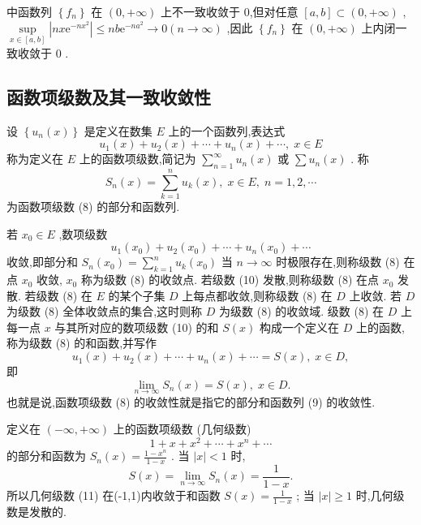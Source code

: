 \begin{example}

\end{example}
中函数列 \(\left\{  {f}_{n}\right\}\) 在 \(\left( {0, + \infty }\right)\) 上不一致收敛于 0,但对任意 \(\left\lbrack  {a,b}\right\rbrack   \subset  \left( {0, + \infty }\right)\) , \(\mathop{\sup }\limits_{{x \in  \left\lbrack  {a,b}\right\rbrack  }}\left| {{nx}{\mathrm{e}}^{-n{x}^{2}}}\right|  \leq  {nb}{\mathrm{e}}^{-n{a}^{2}} \rightarrow  0\left( {n \rightarrow  \infty }\right)\) ,因此 \(\left\{  {f}_{n}\right\}\) 在 \(\left( {0, + \infty }\right)\) 上内闭一致收敛于 0 .

\subsection{函数项级数及其一致收敛性}

设 \(\left\{  {{u}_{n}\left( x\right) }\right\}\) 是定义在数集 \(E\) 上的一个函数列,表达式
\[
{u}_{1}\left( x\right)  + {u}_{2}\left( x\right)  + \cdots  + {u}_{n}\left( x\right)  + \cdots ,\;x \in  E \tag{8}
\]
称为定义在 \(E\) 上的函数项级数,简记为 \(\mathop{\sum }\limits_{{n = 1}}^{\infty }{u}_{n}\left( x\right)\) 或 \(\sum {u}_{n}\left( x\right)\) . 称
\[
{S}_{n}\left( x\right)  = \mathop{\sum }\limits_{{k = 1}}^{n}{u}_{k}\left( x\right) ,\;x \in  E,\;n = 1,2,\cdots  \tag{9}
\]
为函数项级数 (8) 的部分和函数列.

若 \({x}_{0} \in  E\) ,数项级数
\[
{u}_{1}\left( {x}_{0}\right)  + {u}_{2}\left( {x}_{0}\right)  + \cdots  + {u}_{n}\left( {x}_{0}\right)  + \cdots  \tag{10}
\]
收敛,即部分和 \({S}_{n}\left( {x}_{0}\right)  = \mathop{\sum }\limits_{{k = 1}}^{n}{u}_{k}\left( {x}_{0}\right)\) 当 \(n \rightarrow  \infty\) 时极限存在,则称级数 (8) 在点 \({x}_{0}\) 收敛, \({x}_{0}\) 称为级数 (8) 的收敛点. 若级数 (10) 发散,则称级数 (8) 在点 \({x}_{0}\) 发散. 若级数 (8) 在 \(E\) 的某个子集 \(D\) 上每点都收敛,则称级数 (8) 在 \(D\) 上收敛. 若 \(D\) 为级数 (8) 全体收敛点的集合,这时则称 \(D\) 为级数 (8) 的收敛域. 级数 (8) 在 \(D\) 上每一点 \(x\) 与其所对应的数项级数 (10) 的和 \(S\left( x\right)\) 构成一个定义在 \(D\) 上的函数,称为级数 (8) 的和函数,并写作
\[
{u}_{1}\left( x\right)  + {u}_{2}\left( x\right)  + \cdots  + {u}_{n}\left( x\right)  + \cdots  = S\left( x\right) ,\;x \in  D,
\]
即
\[
\mathop{\lim }\limits_{{n \rightarrow  \infty }}{S}_{n}\left( x\right)  = S\left( x\right) ,\;x \in  D.
\]
也就是说,函数项级数 (8) 的收敛性就是指它的部分和函数列 (9) 的收敛性.

\begin{example}

\end{example}
定义在 \(\left( {-\infty , + \infty }\right)\) 上的函数项级数 (几何级数)
\[
1 + x + {x}^{2} + \cdots  + {x}^{n} + \cdots  \tag{11}
\]
的部分和函数为 \({S}_{n}\left( x\right)  = \frac{1 - {x}^{n}}{1 - x}\) . 当 \(\left| x\right|  < 1\) 时,
\[
S\left( x\right)  = \mathop{\lim }\limits_{{n \rightarrow  \infty }}{S}_{n}\left( x\right)  = \frac{1}{1 - x}.
\]
所以几何级数 (11) 在(-1,1)内收敛于和函数 \(S\left( x\right)  = \frac{1}{1 - x}\) ; 当 \(\left| x\right|  \geq  1\) 时,几何级数是发散的.


